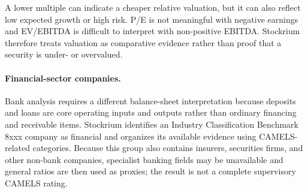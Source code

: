 A lower multiple can indicate a cheaper relative valuation, but it can also reflect low expected growth or high risk. P/E is not meaningful with negative earnings and EV/EBITDA is difficult to interpret with non-positive EBITDA. Stockrium therefore treats valuation as comparative evidence rather than proof that a security is under- or overvalued.

\paragraph{Financial-sector companies.}

Bank analysis requires a different balance-sheet interpretation because deposits and loans are core operating inputs and outputs rather than ordinary financing and receivable items. Stockrium identifies an Industry Classification Benchmark 8xxx company as financial and organizes its available evidence using CAMELS-related categories. Because this group also contains insurers, securities firms, and other non-bank companies, specialist banking fields may be unavailable and general ratios are then used as proxies; the result is not a complete supervisory CAMELS rating.

